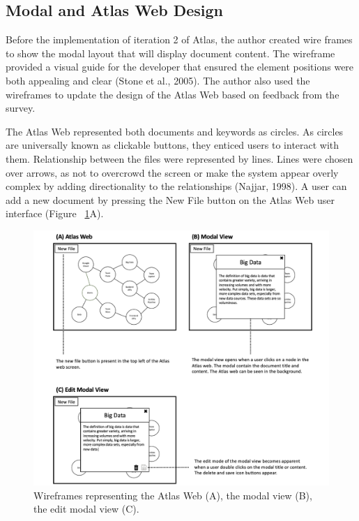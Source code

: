 \documentclass{article}
\begin{document}
\newpage

\subsection{Modal and Atlas Web Design}

Before the implementation of iteration 2 of Atlas, the author created wire frames to show the modal layout that will display document content. The wireframe provided a visual guide for the developer that ensured the element positions were both appealing and clear (Stone et al., 2005). The author also used the wireframes to update the design of the Atlas Web based on feedback from the survey.

The Atlas Web represented both documents and keywords as circles. As circles are universally known as clickable buttons, they enticed  users to interact with them. Relationship between the files were represented by lines. Lines were chosen over arrows, as not to overcrowd the screen or make the system appear overly complex by adding directionality to the relationships (Najjar, 1998). A user can add a new document by pressing the New File button on the Atlas Web user interface (Figure ~\ref{fig:modal}A). 

\begin{figure}[!htb]
  \centering
      \includegraphics[width=1\textwidth]{images/modal-diagram.png}
  \caption{Wireframes representing the Atlas Web (A), the modal view (B), the edit modal view (C).}
  \label{fig:modal}
\end{figure}
\end{document}
